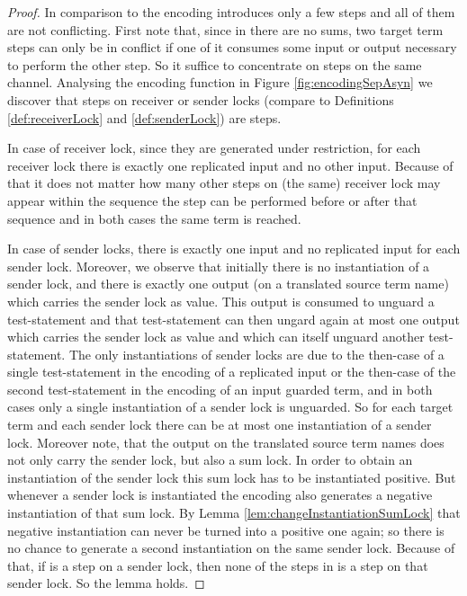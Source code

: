 \documentclass[]{llncs}
\begin{document}
\begin{proof}
	In comparison to  the encoding  introduces only a few \pure \admin steps and all of them are not conflicting. First note that, since in \piAsyn there are no sums, two target term steps can only be in conflict if one of it consumes some input or output necessary to perform the other step. So it suffice to concentrate on steps on the same channel. Analysing the encoding function in Figure \ref{fig:encodingSepAsyn} we discover that steps on receiver or sender locks (compare to Definitions \ref{def:receiverLock} and \ref{def:senderLock}) are \pure \admin steps.
	
	In case of receiver lock, since they are generated under restriction, for each receiver lock there is exactly one replicated input and no other input. Because of that it does not matter how many other steps on (the same) receiver lock may appear within the sequence  the step  can be performed before or after that sequence and in both cases the same term  is reached.
	
	In case of sender locks, there is exactly one input and no replicated input for each sender lock. Moreover, we observe that initially there is no instantiation of a sender lock, and there is exactly one output (on a translated source term name) which carries the sender lock as value. This output is consumed to unguard a test-statement and that test-statement can then ungard again at most one output which carries the sender lock as value and which can itself unguard another test-statement. The only instantiations of sender locks are due to the then-case of a single test-statement in the encoding of a replicated input or the then-case of the second test-statement in the encoding of an input guarded term, and in both cases only a single instantiation of a sender lock is unguarded. So for each target term and each sender lock there can be at most one instantiation of a sender lock. Moreover note, that the output on the translated source term names does not only carry the sender lock, but also a sum lock. In order to obtain an instantiation of the sender lock this sum lock has to be instantiated positive. But whenever a sender lock is instantiated the encoding also generates a negative instantiation of that sum lock. By Lemma \ref{lem:changeInstantiationSumLock} that negative instantiation can never be turned into a positive one again; so there is no chance to generate a second instantiation on the same sender lock. Because of that, if  is a step on a sender lock, then none of the steps in  is a step on that sender lock. So the lemma holds.
	

\end{proof}
\end{document}
